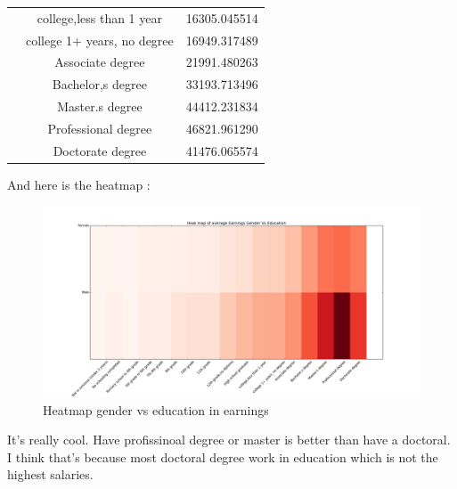 \documentclass{article}
\begin{document}
\begin{table}[H]
\begin{tabular}{|c|c|c|}
	 &college,less than 1 year&16305.045514\\ \hhline{~--} 
	 &college 1+ years, no degree&16949.317489\\ \hhline{~--} 
	 &Associate degree&21991.480263\\ \hhline{~--} 
	 &Bachelor,s degree&33193.713496\\ \hhline{~--} 
	 &Master.s degree&44412.231834\\ \hhline{~--} 
	 &Professional degree&46821.961290\\ \hhline{~--} 
	 &Doctorate degree&41476.065574 \\ \hline
  \end{tabular}
  \label{T:peak}
\end{table}
And here is the heatmap : 
\begin{figure}[H]
\includegraphics[scale=0.42,trim={3cm 0cm 7cm 2cm},clip]{hmGEE.png}
\caption{Heatmap gender vs education in earnings}
\end{figure}
It's really cool. Have profissinoal degree or master is better than have a doctoral. I think that's because most doctoral degree work in education which is not the highest salaries.
\end{document}
